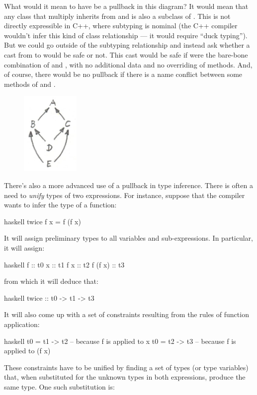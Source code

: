 What would it mean to have  be a pullback in this diagram? It would
mean that any class  that multiply inherits from  and  is also a
subclass of . This is not directly expressible in C++, where subtyping
is nominal (the C++ compiler wouldn't infer this kind of class
relationship --- it would require ``duck typing''). But we could go
outside of the subtyping relationship and instead ask whether a cast
from  to  would be safe or not. This cast would be safe if  were the
bare-bone combination of  and , with no additional data and no
overriding of methods. And, of course, there would be no pullback if
there is a name conflict between some methods of  and .

\begin{figure}[H]
  \centering
  \includegraphics[width=0.25\textwidth]{images/classes.jpg}
\end{figure}

\noindent
There's also a more advanced use of a pullback in type inference. There
is often a need to \emph{unify} types of two expressions. For instance,
suppose that the compiler wants to infer the type of a function:

\begin{snip}{haskell}
twice f x = f (f x)
\end{snip}
It will assign preliminary types to all variables and sub-expressions.
In particular, it will assign:

\begin{snip}{haskell}
f       :: t0
x       :: t1
f x     :: t2
f (f x) :: t3
\end{snip}
from which it will deduce that:

\begin{snip}{haskell}
twice :: t0 -> t1 -> t3
\end{snip}
It will also come up with a set of constraints resulting from the rules
of function application:

\begin{snip}{haskell}
t0 = t1 -> t2 -- because f is applied to x
t0 = t2 -> t3 -- because f is applied to (f x)
\end{snip}
These constraints have to be unified by finding a set of types (or type
variables) that, when substituted for the unknown types in both
expressions, produce the same type. One such substitution is:

